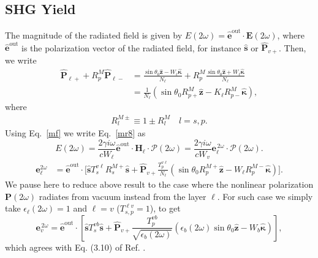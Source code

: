 \subsection{SHG Yield}

The magnitude of the radiated field is given by
$E(2\omega)=\hat{\mathbf{e}}^{\mathrm{out}}\cdot\mathbf{E}(2\omega)$, where
$\hat{\mathbf{e}}^{\mathrm{out}}$ is the polarization vector of the radiated
field, for instance $\hat{\mathbf{s}}$ or $\hat{\mathbf{P}}_{v+}$. Then, we
write
\begin{equation}\label{m1}
\begin{split}
\hat{\mathbf{P}}_{\ell +} + R^M_p\hat{\mathbf{P}}_{\ell -}
&= \frac{\sin\theta_{0}\hat{\mathbf{z}} - W_{\ell}\hat{\boldsymbol{\kappa}}}
        {N_{\ell}}
 + R^M_p
   \frac{\sin\theta_{0}\hat{\mathbf{z}} + W_{\ell}\hat{\boldsymbol{\kappa}}}
        {N_{\ell}}
\\
&= \frac{1}{N_{\ell}}
\left(
\sin\theta_{0}R^M_{p+}\hat{\mathbf{z}}
- K_{\ell}R^M_{p-}\hat{\boldsymbol{\kappa}}
\right)
,
\end{split}
\end{equation}
where
\begin{align}\label{rm}
R^{M\pm}_l\equiv 1 \pm R^M_l \quad l=s,p
.
\end{align}
 Using Eq.~\eqref{mf}
 we write Eq.~\eqref{mr8} as
\begin{equation}\label{r10}
E(2\omega) = \frac{2\gamma i \omega}{cW_\ell}
\hat{\mathbf{e}}^{\mathrm{out}}\cdot 
\mathbf{H}_{\ell}\cdot 
\boldsymbol{\mathcal{P}}(2\omega) 
= \frac{2\gamma i \omega}{cW_v}
 \mathbf{e}^{\,2\omega}_{\ell}\cdot\boldsymbol{\mathcal{P}}(2\omega). 
\end{equation}
\begin{equation}\label{r12mm}
\begin{split}
\mathbf{e}^{2\omega}_{\ell} &=\hat{\mathbf{e}}^{\mathrm{out}}\cdot 
\Bigg[
\hat{\mathbf{s}}T_{s}^{v\ell}R^{M+}_s\hat{\mathbf{s}} + 
\hat{\mathbf{P}}_{v+}
\frac{T^{v\ell}_{p}}
     {N_\ell}
\left(
\sin\theta_{0}R^{M+}_p\hat{\mathbf{z}}
- W_{\ell}R^{M-}_p\hat{\boldsymbol{\kappa}}
\right) 
\Bigg]
. 
\end{split}
\end{equation}  
 We pause here to reduce above result to the case where the nonlinear
polarization $\mathbf{P}(2\omega)$ radiates from vacuum instead from the layer
$\ell$. For such case we simply take $\epsilon_{\ell}(2\omega)=1$ and $\ell=v$
($T^{\ell v}_{s,p}=1$), to get
\begin{equation}\label{r13}
\mathbf{e}^{\,2\omega}_{v} = \hat{\mathbf{e}}^{\mathrm{out}}
\cdot\left[
\hat{\mathbf{s}}T_s^{v b}\hat{\mathbf{s}} + \hat{\mathbf{P}}_{v+}
\frac{T^{v b}_{p}}{\sqrt{\epsilon_{b}(2\omega)}}
\left(
  \epsilon_{b}(2\omega)\sin\theta_{0}\hat{\mathbf{z}}
  - W_{b}\hat{\boldsymbol{\kappa}}
\right) 
\right] 
,
\end{equation}
which agrees with Eq. (3.10) of Ref. \cite{mizrahiJOSA88}.


